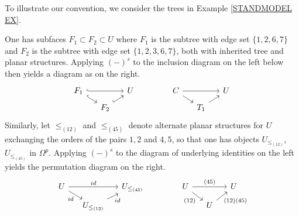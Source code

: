 \documentclass[a4paper,10pt]{article}%
\begin{document}
\begin{example}
  To illustrate our convention, we consider the trees in Example \ref{STANDMODEL EX}. 

  One has subfaces
  $F_1 \subset F_2 \subset U$
  where $F_1$ is the subtree with edge set $\{1,2,6,7\}$ and 
  $F_2$ is the subtree with edge set $\{1,2,3,6,7\}$, both with inherited tree and planar structures. 
  Applying $(\minus)^s$ to the inclusion diagram on the left below then yields a diagram as on the right.
  \[
  \begin{tikzcd}[row sep = 0.5em,column sep =1.3em]
    F_1 \ar[hookrightarrow]{rr} \ar[hookrightarrow]{rd} & & U & &&
    C \ar{rr} \ar{rd} & & U
    \\
    & F_2 \ar[hookrightarrow]{ru} & & &&
    & T_1 \ar{ru}
  \end{tikzcd}
  \]
  Similarly, let $\leq_{(12)}$ and $\leq_{(45)}$ denote alternate planar structures for $U$ exchanging the orders of the pairs $1,2$ and $4,5$, so that one has objects 
  $U_{\leq_{(12)}}$, $U_{\leq_{(45)}}$ in $\Omega^p$. 
  Applying $(\minus)^s$ to the diagram of underlying identities on the left yields the permutation diagram on the right.
  \[
  \begin{tikzcd}[row sep = 0.5em,column sep =1.3em]
    U \ar{rr}{id} \ar{rd}[swap]{id} & & U_{\leq_{(45)}} & & &
    U \ar{rr}{(45)} \ar{rd}[swap]{(12)} & & U
    \\
    & U_{\leq_{(12)}} \ar{ru}[swap]{id} & & & &
    & U \ar{ru}[swap]{(12)(45)}
  \end{tikzcd}
  \]
\end{example}
\end{document}
